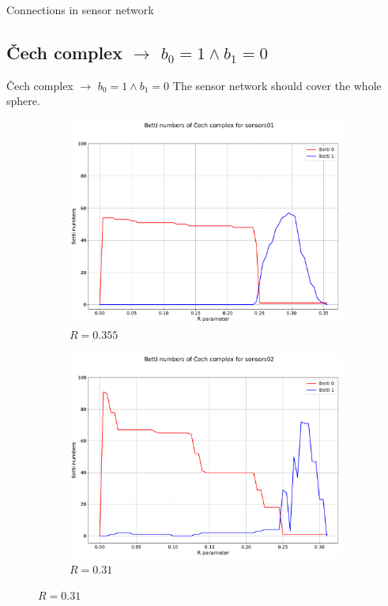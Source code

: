 \documentclass{beamer}
\begin{document}
\begin{frame}{Connections in sensor network}
\begin{figure}[!ht]
\end{figure}
\end{frame}










\subsection{Čech complex $\longrightarrow$ $b_0 = 1 \wedge b_1 = 0$}

\begin{frame}{Čech complex $\longrightarrow$ $b_0 = 1 \wedge b_1 = 0$}
The sensor network should cover the whole sphere.
\begin{figure}[!ht]
	\centering
	\begin{subfigure}{.5\textwidth}
		\centering
		\includegraphics[scale=0.19]{used_images/plot_cech_sensors01.pdf}
		\caption{$R = 0.355$}
	\end{subfigure}%
	\begin{subfigure}{.5\textwidth}
		\centering
		\includegraphics[scale=0.19]{used_images/plot_cech_sensors02.pdf}
		\caption{$R = 0.31$}
	\end{subfigure}%
	

\end{figure}
\end{frame}
\end{document}
